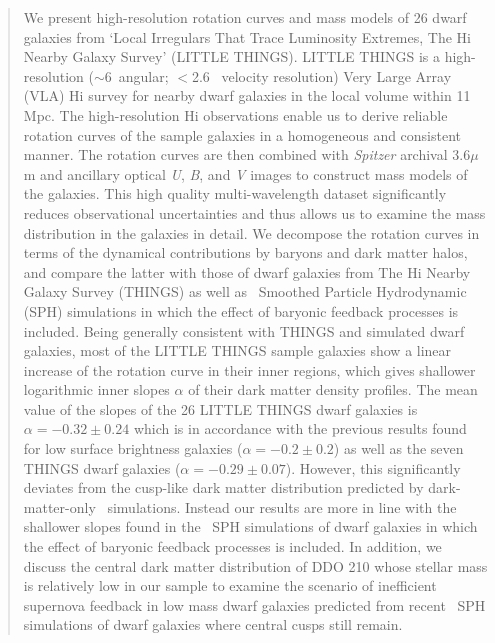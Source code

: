 \documentclass[natbib209]{emulateapj}
\begin{document}
\begin{abstract}
We present high-resolution rotation curves and mass models of 26 dwarf galaxies
from `Local Irregulars That Trace Luminosity Extremes, The H{\sc i} Nearby
Galaxy Survey' (LITTLE THINGS). LITTLE THINGS is a high-resolution
($\sim$6\arcsec\ angular; $<$2.6 \kms\ velocity resolution) Very Large Array
(VLA) H{\sc i} survey for nearby dwarf galaxies in the local volume within 11
Mpc. The high-resolution H{\sc i} observations enable us to derive reliable
rotation curves of the sample galaxies in a homogeneous and consistent manner.
The rotation curves are then combined with {\it Spitzer} archival 3.6$\mu$m and
ancillary optical {\it U}, {\it B}, and {\it V} images to construct mass models
of the galaxies. This high quality multi-wavelength dataset significantly
reduces observational uncertainties and thus allows us to examine the mass
distribution in the galaxies in detail. We decompose the rotation curves in
terms of the dynamical contributions by baryons and dark matter halos, and
compare the latter with those of dwarf galaxies from The H{\sc i} Nearby Galaxy
Survey (THINGS) as well as \LCDM\ Smoothed Particle Hydrodynamic (SPH)
simulations in which the effect of baryonic feedback processes is included.
Being generally consistent with THINGS and simulated dwarf galaxies, most of the
LITTLE THINGS sample galaxies show a linear increase of the rotation curve in
their inner regions, which gives shallower logarithmic inner slopes $\alpha$ of
their dark matter density profiles. The mean value of the slopes of the 26
LITTLE THINGS dwarf galaxies is $\alpha =-0.32 \pm 0.24$ which is in accordance
with the previous results found for low surface brightness galaxies ($\alpha
=-0.2 \pm 0.2$) as well as the seven THINGS dwarf galaxies ($\alpha =-0.29 \pm
0.07$). However, this significantly deviates from the cusp-like dark matter
distribution predicted by dark-matter-only \LCDM\ simulations. Instead our
results are more in line with the shallower slopes found in the \LCDM\ SPH
simulations of dwarf galaxies in which the effect of baryonic feedback processes
is included. In addition, we discuss the central dark matter distribution of
DDO 210 whose stellar mass is relatively low in our sample to examine the
scenario of inefficient supernova feedback in low mass dwarf galaxies predicted
from recent \LCDM\ SPH simulations of dwarf galaxies where central cusps still remain.
\end{abstract}
\end{document}
